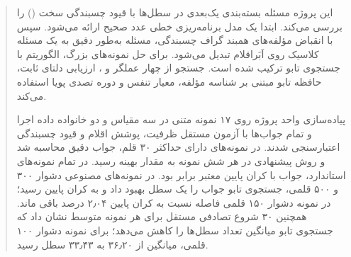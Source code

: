 \begin{abstract}
این پروژه مسئله بسته‌بندی یک‌بعدی در سطل‌ها با قیود چسبندگی سخت
() را بررسی می‌کند. ابتدا یک مدل برنامه‌ریزی خطی عدد صحیح ارائه
می‌شود. سپس با انقباض مؤلفه‌های همبند گراف چسبندگی، مسئله به‌طور دقیق به یک
مسئله کلاسیک  روی اَبَراقلام تبدیل می‌شود. برای حل نمونه‌های
بزرگ، الگوریتم  با جستجوی تابو ترکیب شده است. جستجو
از چهار عملگر  و ، ارزیابی دلتای ثابت، حافظه
تابو مبتنی بر شناسه مؤلفه، معیار تنفس و دوره تصدی پویا استفاده می‌کند.

پیاده‌سازی واحد پروژه روی ۱۷ نمونه متنی در سه مقیاس و دو خانواده داده اجرا و
تمام جواب‌ها با آزمون مستقل ظرفیت، پوشش اقلام و قیود چسبندگی اعتبارسنجی شدند.
در نمونه‌های دارای حداکثر ۳۰ قلم، جواب دقیق  محاسبه شد و روش پیشنهادی
در هر شش نمونه به مقدار بهینه رسید. در تمام نمونه‌های استاندارد، جواب با کران
پایین معتبر برابر بود. در نمونه‌های مصنوعی دشوار ۳۰۰ و ۵۰۰ قلمی، جستجوی تابو
جواب  را یک سطل بهبود داد و به کران پایین رسید؛ در نمونه دشوار ۱۵۰
قلمی فاصله نسبت به کران پایین ۲٫۰۴ درصد باقی ماند. همچنین ۳۰ شروع تصادفی مستقل
برای هر نمونه متوسط نشان داد که جستجوی تابو میانگین تعداد سطل‌ها را کاهش می‌دهد؛
برای نمونه دشوار ۱۰۰ قلمی، میانگین از ۳۶٫۲۰ به ۳۳٫۴۳ سطل رسید.
\end{abstract}
